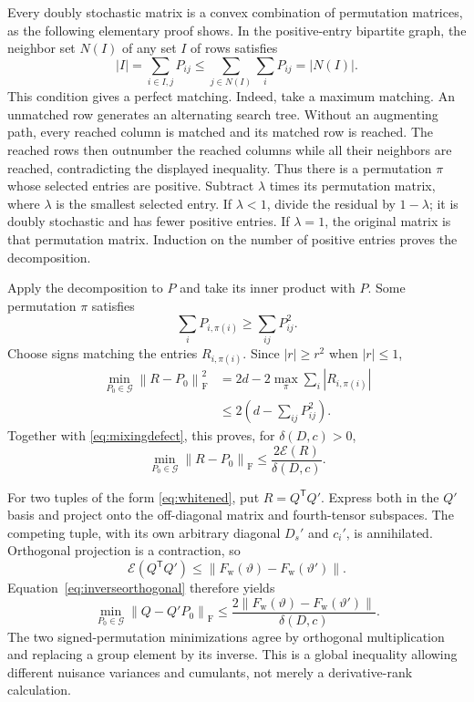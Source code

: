 \documentclass[11pt,a4paper]{article}
\numberwithin{equation}{section}
\newcommand{\cG}{\mathcal G}
\newcommand{\T}{\mathsf T}
\newcommand{\F}{\mathrm F}
\newcommand{\norm}[1]{\left\lVert #1\right\rVert}
\begin{document}
Every doubly stochastic matrix is a convex combination of permutation
matrices, as the following elementary proof shows.
In the positive-entry bipartite graph, the neighbor set \(N(I)\) of any
set \(I\) of rows satisfies
\[
 |I|=\sum_{i\in I,j}P_{ij}
 \le\sum_{j\in N(I)}\sum_iP_{ij}=|N(I)|.
\]
This condition gives a perfect matching. Indeed, take a maximum matching.
An unmatched row generates an alternating search tree. Without an
augmenting path, every reached column is matched and its matched row is
reached. The reached rows then outnumber the reached columns while all
their neighbors are reached, contradicting the displayed inequality.
Thus there is a permutation \(\pi\) whose selected entries are positive.
Subtract \(\lambda\) times its permutation matrix, where \(\lambda\) is the
smallest selected entry. If \(\lambda<1\), divide the residual by
\(1-\lambda\); it is doubly stochastic and has fewer positive entries.
If \(\lambda=1\), the original matrix is that permutation matrix.
Induction on the number of positive entries proves the decomposition.

Apply the decomposition to \(P\) and take its inner product with \(P\).
Some permutation \(\pi\) satisfies
\[
 \sum_iP_{i,\pi(i)}\ge\sum_{ij}P_{ij}^2.
\]
Choose signs matching the entries \(R_{i,\pi(i)}\).
Since \(|r|\ge r^2\) when \(|r|\le1\),
\begin{align*}
 \min_{P_0\in\cG}\norm{R-P_0}_{\F}^2
 &=2d-2\max_\pi\sum_i|R_{i,\pi(i)}|\\
 &\le2\left(d-\sum_{ij}P_{ij}^2\right).
\end{align*}
Together with \eqref{eq:mixingdefect}, this proves, for \(\delta(D,c)>0\),
\begin{equation}\label{eq:inverseorthogonal}
 \min_{P_0\in\cG}\norm{R-P_0}_{\F}
 \le\frac{2\mathcal E(R)}{\delta(D,c)}.
\end{equation}

For two tuples of the form \eqref{eq:whitened}, put \(R=Q^\T Q'\).
Express both in the \(Q'\) basis and project onto the off-diagonal matrix
and fourth-tensor subspaces. The competing tuple, with its own arbitrary
diagonal \(D_s'\) and \(c_i'\), is annihilated. Orthogonal projection is a
contraction, so
\[
 \mathcal E(Q^\T Q')
 \le\norm{F_{\mathrm w}(\vartheta)-F_{\mathrm w}(\vartheta')}.
\]
Equation~\eqref{eq:inverseorthogonal} therefore yields
\begin{equation}\label{eq:inversefeatures}
 \min_{P_0\in\cG}\norm{Q-Q'P_0}_{\F}
 \le\frac{2\norm{F_{\mathrm w}(\vartheta)-F_{\mathrm w}(\vartheta')}}
              {\delta(D,c)}.
\end{equation}
The two signed-permutation minimizations agree by orthogonal
multiplication and replacing a group element by its inverse.
This is a global inequality allowing different nuisance variances and
cumulants, not merely a derivative-rank calculation.
\end{document}
